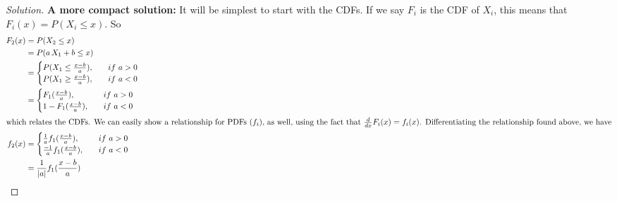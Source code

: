 \documentclass{article}
\newenvironment{solution}{\begin{proof}[Solution]}{\end{proof}}
\begin{document}
\begin{solution}
    \item {\bf A more compact solution:} It will be simplest to start with the CDFs. If we say $F_i$ is the CDF of $X_i$, this means that $F_i(x) = P(X_i \leq x)$. So
	\begin{align}
		F_2(x) &= P(X_2 \leq x)\\
		&= P(a \, X_1 + b \leq x)\\
		&= \begin{cases}
				P(X_1 \leq \frac{x - b}{a}), \quad &if \ a > 0\\
				P(X_1 \geq \frac{x - b}{a}), \quad  &if \ a < 0
			\end{cases}\\
		&= \begin{cases}
				F_1(\frac{x - b}{a}), \quad  &if \ a > 0 \\
				1 - F_1(\frac{x - b}{a}), \quad  &if \ a < 0 
			\end{cases}\\
		\intertext{which relates the CDFs. We can easily show a relationship for PDFs ($f_i$), as well, using the fact that $\frac{d}{dx}F_i(x) = f_i(x)$. Differentiating the relationship found above, we have}
		f_2(x) &= \begin{cases}
						\frac{1}{a}f_1(\frac{x - b}{a}), \quad  &if \ a > 0\\
						\frac{-1}{a}f_1(\frac{x - b}{a}), \quad  &if \ a < 0
					\end{cases}\\
		&= \frac{1}{|a|}f_1(\frac{x - b}{a}) 
	\end{align}
	
\end{solution}


 \vspace{0.25in} %
\end{document}
